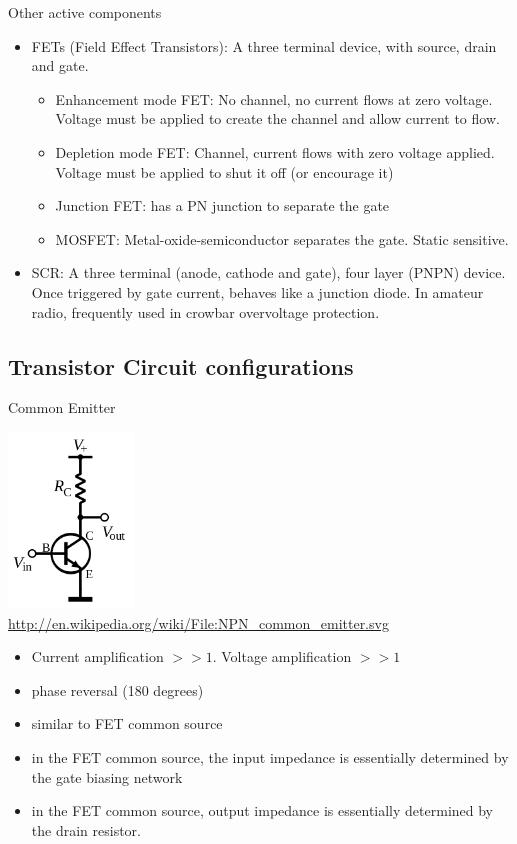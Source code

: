 \documentclass{beamer}
\begin{document}
\begin{frame}{Other active components}{}
\begin{itemize}
\item FETs (Field Effect Transistors): A three terminal device, with source, drain and gate.
\begin{itemize}
\item Enhancement mode FET: No channel, no current flows at zero voltage.  Voltage must be applied to create the channel and allow current to flow.
\item Depletion mode FET: Channel, current flows with zero voltage applied.  Voltage must be applied to shut it off (or encourage it)
\item Junction FET: has a PN junction to separate the gate
\item MOSFET: Metal-oxide-semiconductor separates the gate.  Static sensitive.
\end{itemize}
\item SCR: A three terminal (anode, cathode and gate), four layer (PNPN) device.  Once triggered by gate current, behaves like a junction diode.  In amateur radio, frequently used in crowbar overvoltage protection.
\end{itemize}
\end{frame}

\subsection{Transistor Circuit configurations}
\begin{frame}{Common Emitter}{}
\begin{center}
\includegraphics[width=0.25\textwidth]{images/common_emitter.png} \\
{\tiny \url{http://en.wikipedia.org/wiki/File:NPN_common_emitter.svg}}
\end{center}
\begin{itemize}
\item Current amplification $>> 1$. Voltage amplification $>> 1$
\item phase reversal (180 degrees)
\item similar to FET common source
\item in the FET common source, the input impedance is essentially determined by the gate biasing network
\item in the FET common source, output impedance is essentially determined by the drain resistor.
\end{itemize}
\end{frame}
\end{document}
